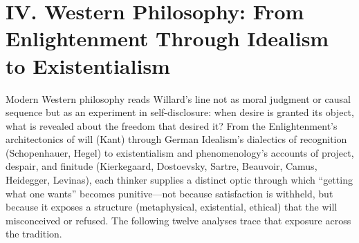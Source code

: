\section*{IV. Western Philosophy: From Enlightenment Through Idealism to Existentialism}
\label{sec:iv-western-philosophy}

Modern Western philosophy reads Willard's line not as moral judgment or causal sequence but as
an experiment in self-disclosure: when desire is granted its object, what is revealed about the
freedom that desired it? From the Enlightenment's architectonics of will (Kant) through German
Idealism's dialectics of recognition (Schopenhauer, Hegel) to existentialism and phenomenology's
accounts of project, despair, and finitude (Kierkegaard, Dostoevsky, Sartre, Beauvoir, Camus,
Heidegger, Levinas), each thinker supplies a distinct optic through which ``getting what one
wants'' becomes punitive—not because satisfaction is withheld, but because it exposes a
structure (metaphysical, existential, ethical) that the will misconceived or refused. The
following twelve analyses trace that exposure across the tradition.


\pagebreak[2]

\pagebreak[2]

\pagebreak[2]

\pagebreak[2]

\pagebreak[2]

\pagebreak[2]

\pagebreak[2]

\pagebreak[2]

\pagebreak[2]

\pagebreak[2]

\pagebreak[2]

\pagebreak[2]

